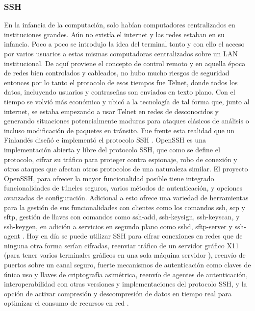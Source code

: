 \subsubsection{SSH}
En la infancia de la computación, solo habían computadores centralizados en instituciones grandes. Aún no existía el internet y las  redes estaban en su infancia. Poco a poco se introdujo la idea del terminal tonto y con ello el acceso por varios usuarios a estas mismas computadoras centralizados sobre un LAN institucional. De aquí proviene el concepto de control remoto y en aquella época de redes bien controlados y cableados, no hubo mucho riesgos de seguridad entonces por lo tanto el protocolo de esos tiempos fue Telnet, donde todos los datos, incluyendo usuarios y contraseñas son enviados en texto plano. Con el tiempo se volvió más económico y ubicó a la tecnología de tal forma que, junto al internet, se estaba empezando a usar Telnet en redes de desconocidos y generando situaciones potencialmente maduras para ataques clásicos de análisis o incluso modificación de paquetes en tránsito. Fue frente esta realidad que un Finlandés diseñó e implementó el protocolo SSH \citep{GeerlingJeff-History-Remote-Access}. OpenSSH es una implementación abierta y libre \citep{OpenBSD-OpenSSH-Features} del protocolo SSH, que como se define el protocolo, cifrar su tráfico para proteger contra espionaje, robo de conexión y otros ataques que afectan otros protocolos de una naturaleza similar. El proyecto OpenSSH, para ofrecer la mayor funcionalidad posible tiene integrado funcionalidades de túneles seguros, varios métodos de autenticación, y opciones avanzadas de configuración. Adicional a esto ofrece una variedad de herramientas para la gestión de sus funcionalidades con clientes como los comandos ssh, scp y sftp, gestión de llaves con comandos como ssh-add, ssh-keysign, ssh-keyscan, y ssh-keygen, en adición a servicios en segundo plano como sshd, sftp-server y ssh-agent \citep{OpenSSH}. Hoy en día se puede utilizar SSH para cifrar conexiones en redes que de ninguna otra forma serían cifradas, reenviar tráfico de un servidor gráfico X11 (para tener varios terminales gráficos en una sola máquina servidor \citep{ENP-Tunneling}), reenvío de puertos sobre un canal seguro, fuerte mecanismos de autenticación como claves de único uso y llaves de criptografía asimétrica, reenvío de agentes de autenticación, interoperabilidad con otras versiones y implementaciones del protocolo SSH, y la opción de activar compresión y descompresión de datos en tiempo real para optimizar el consumo de recursos en red \citep{OpenBSD-OpenSSH-Features} \citep{OpenBSD-manpages-SSH}.

